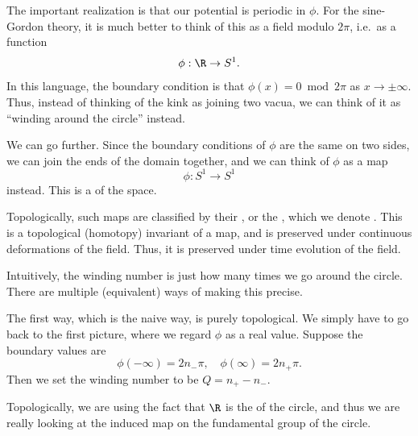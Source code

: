 \documentclass[a4paper]{article}
\begin{document}
The important realization is that our potential is periodic in $\phi$. For the sine-Gordon theory, it is much better to think of this as a field modulo $2\pi$, i.e.\ as a function
\[
  \phi: \R \to S^1.
\]
In this language, the boundary condition is that $\phi(x) = 0 \bmod 2\pi$ as $x \to \pm \infty$. Thus, instead of thinking of the kink as joining two vacua, we can think of it as ``winding around the circle'' instead.

We can go further. Since the boundary conditions of $\phi$ are the same on two sides, we can join the ends of the domain together, and we can think of $\phi$ as a map
\[
  \phi: S^1 \to S^1
\]
instead. This is a  of the space.

Topologically, such maps are classified by their , or the , which we denote . This is a topological (homotopy) invariant of a map, and is preserved under continuous deformations of the field. Thus, it is preserved under time evolution of the field.

Intuitively, the winding number is just how many times we go around the circle. There are multiple (equivalent) ways of making this precise.

The first way, which is the naive way, is purely topological. We simply have to go back to the first picture, where we regard $\phi$ as a real value. Suppose the boundary values are
\[
  \phi(-\infty) = 2 n_- \pi,\quad \phi(\infty) = 2 n_+ \pi.
\]
Then we set the winding number to be $Q = n_+ - n_-$.

Topologically, we are using the fact that $\R$ is the  of the circle, and thus we are really looking at the induced map on the fundamental group of the circle.
\end{document}
